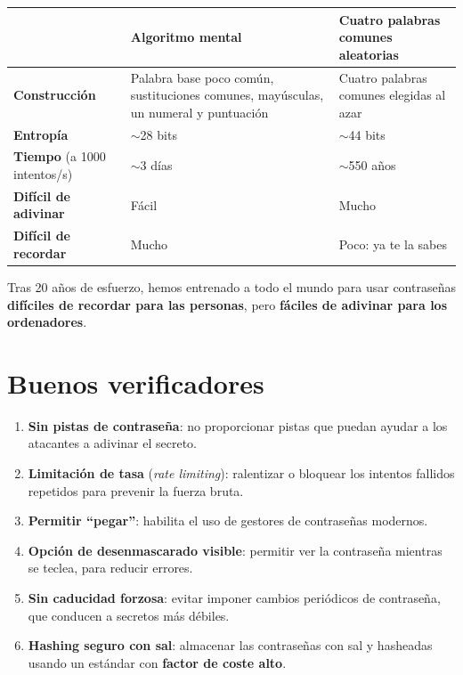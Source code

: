 \documentclass[11pt,a4paper]{report}
\begin{document}
\begin{center}
\small
{\setlength{\aboverulesep}{0pt}\setlength{\belowrulesep}{0pt}\renewcommand{\arraystretch}{1.3}%
\begin{tabularx}{\linewidth}{>{\raggedright\arraybackslash}p{3.2cm} !{\color{gray!45}\vrule width 0.2pt} >{\raggedright\arraybackslash}X !{\color{gray!45}\vrule width 0.2pt} >{\raggedright\arraybackslash}X}
\toprule
 & \textbf{Algoritmo mental} & \textbf{Cuatro palabras comunes aleatorias} \\
\midrule
\textbf{Construcción} & Palabra base poco común, sustituciones comunes, mayúsculas, un numeral y puntuación & Cuatro palabras comunes elegidas al azar \\
\textbf{Entropía} & $\sim$28 bits & $\sim$44 bits \\
\textbf{Tiempo} (a 1000 intentos/s) & $\sim$3 días & $\sim$550 años \\
\textbf{Difícil de adivinar} & Fácil & Mucho \\
\textbf{Difícil de recordar} & Mucho & Poco: ya te la sabes \\
\bottomrule
\end{tabularx}}
\end{center}
 
\begin{importante}[title={Moraleja de la viñeta}]
Tras 20 años de esfuerzo, hemos entrenado a todo el mundo para usar contraseñas \textbf{difíciles de recordar para las personas}, pero \textbf{fáciles de adivinar para los ordenadores}.
\end{importante}
 
\section{Buenos verificadores}
 
\begin{enumerate}
  \item \textbf{Sin pistas de contraseña}: no proporcionar pistas que puedan ayudar a los atacantes a adivinar el secreto.
  \item \textbf{Limitación de tasa} (\emph{rate limiting}): ralentizar o bloquear los intentos fallidos repetidos para prevenir la fuerza bruta.
  \item \textbf{Permitir ``pegar''}: habilita el uso de gestores de contraseñas modernos.
  \item \textbf{Opción de desenmascarado visible}: permitir ver la contraseña mientras se teclea, para reducir errores.
  \item \textbf{Sin caducidad forzosa}: evitar imponer cambios periódicos de contraseña, que conducen a secretos más débiles.
  \item \textbf{Hashing seguro con sal}: almacenar las contraseñas con sal y hasheadas usando un estándar con \textbf{factor de coste alto}.
\end{enumerate}
 
\end{document}
